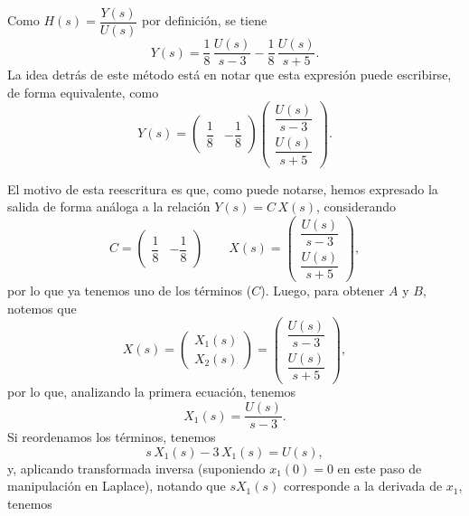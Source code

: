 \documentclass[
  11pt,
  letterpaper,
   addpoints,
   answers
  ]{exam}
\begin{document}
\begin{questions}
\begin{solution}
Como $H(s) = \dfrac{Y(s)}{U(s)}$ por definición, se tiene
\begin{equation}
Y(s) = \frac{1}{8}\,\frac{U(s)}{s-3} - \frac{1}{8}\,\frac{U(s)}{s+5}.
\end{equation}
La idea detrás de este método está en notar que esta expresión puede escribirse, de forma equivalente, como
\begin{equation}
Y(s) = \begin{pmatrix} \dfrac{1}{8} & -\dfrac{1}{8} \end{pmatrix}
\begin{pmatrix}
\dfrac{U(s)}{s-3} \\[8pt]
\dfrac{U(s)}{s+5}
\end{pmatrix}.
\end{equation}

El motivo de esta reescritura es que, como puede notarse, hemos expresado la salida de forma análoga a la relación $Y(s)=C\,X(s)$, considerando
\begin{equation}
C = \begin{pmatrix} \dfrac{1}{8} & -\dfrac{1}{8} \end{pmatrix}
\qquad
X(s) =
\begin{pmatrix}
\dfrac{U(s)}{s-3} \\[8pt]
\dfrac{U(s)}{s+5}
\end{pmatrix},
\end{equation}
por lo que ya tenemos uno de los términos ($C$). Luego, para obtener $A$ y $B$, notemos que
\begin{equation}
X(s) =
\begin{pmatrix}
X_1(s) \\ X_2(s)
\end{pmatrix}
=
\begin{pmatrix}
\dfrac{U(s)}{s-3} \\[8pt]
\dfrac{U(s)}{s+5}
\end{pmatrix},
\end{equation}
por lo que, analizando la primera ecuación, tenemos
\begin{equation}
X_1(s) = \frac{U(s)}{s-3}.
\end{equation}
Si reordenamos los términos, tenemos
\begin{equation}
s\,X_1(s) - 3\,X_1(s) = U(s),
\end{equation}
y, aplicando transformada inversa (suponiendo $x_1(0)=0$ en este paso de manipulación en Laplace), notando que $sX_1(s)$ corresponde a la derivada de $x_1$, tenemos
\begin{equation}

\end{equation}
\end{solution}
\end{questions}
\end{document}
